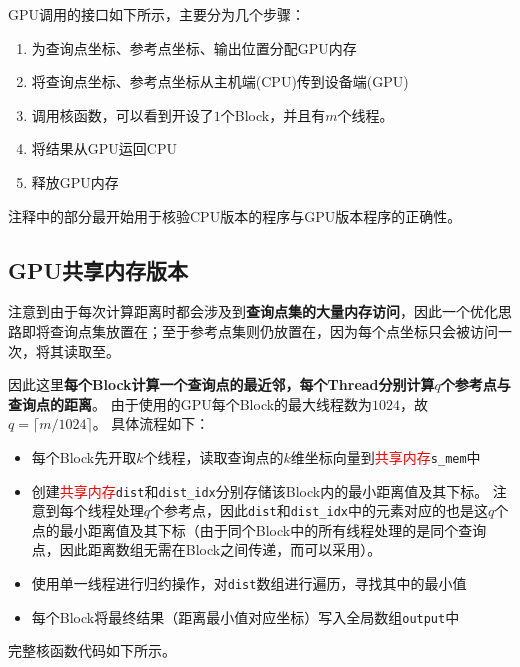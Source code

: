\documentclass[logo,reportComp]{thesis}
\def\globalmem{\textcolor{black}{\kaiti 全局内存}}
\def\sharedmem{\textcolor{red}{\kaiti 共享内存}}
\begin{document}
GPU调用的接口如下所示，主要分为几个步骤：
\begin{enumerate}
	\item 为查询点坐标、参考点坐标、输出位置分配GPU内存
	\item 将查询点坐标、参考点坐标从主机端(CPU)传到设备端(GPU)
	\item 调用核函数，可以看到开设了$1$个Block，并且有$m$个线程。
	\item 将结果从GPU运回CPU
	\item 释放GPU内存
\end{enumerate}


注释中的部分最开始用于核验CPU版本的程序与GPU版本程序的正确性。

\subsection{GPU共享内存版本}
注意到由于每次计算距离时都会涉及到\textbf{查询点集的大量内存访问}，因此一个优化思路即将查询点集放置在；至于参考点集则仍放置在，因为每个点坐标只会被访问一次，将其读取至。

因此这里\textbf{每个Block计算一个查询点的最近邻，每个Thread分别计算$q$个参考点与查询点的距离}。
由于使用的GPU每个Block的最大线程数为$1024$，故$q=\lceil m/1024\rceil$。
具体流程如下：
\begin{itemize}
	\item 每个Block先开取$k$个线程，读取查询点的$k$维坐标向量到\sharedmem\verb's_mem'中
	\item 创建\sharedmem\verb'dist'和\verb'dist_idx'分别存储该Block内的最小距离值及其下标。
	注意到每个线程处理$q$个参考点，因此\verb'dist'和\verb'dist_idx'中的元素对应的也是这$q$个点的最小距离值及其下标（由于同个Block中的所有线程处理的是同个查询点，因此距离数组无需在Block之间传递，而可以采用）。
	\item 使用单一线程进行归约操作，对\verb'dist'数组进行遍历，寻找其中的最小值
	\item 每个Block将最终结果（距离最小值对应坐标）写入全局数组\verb'output'中
\end{itemize}

完整核函数代码如下所示。

\end{document}
